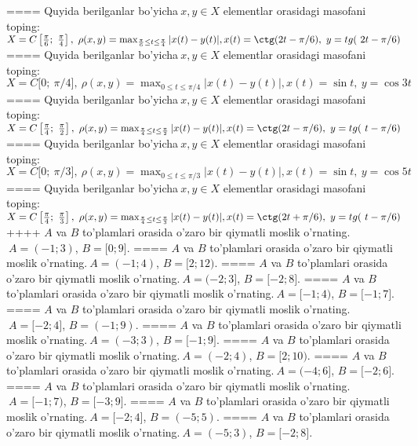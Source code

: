 ====
Quyida berilganlar bo'yicha\(\ x,y \in X\) elementlar orasidagi masofani toping: \(X = C\left\lbrack \frac{\pi}{6};\ \frac{\pi}{4} \right\rbrack,\ \rho(x,y) = \max_{\frac{\pi}{6} \leq t \leq \frac{\pi}{4}}|x(t) - y(t)|,x(t) = \ctg (2t - \pi/6),\ y = tg(\ 2t - \pi/6)\)
====
Quyida berilganlar bo'yicha\(\ x,y \in X\) elementlar orasidagi masofani toping: \(X = C\lbrack 0;\ \pi/4\rbrack,\ \rho(x,y) = \max_{0 \leq t \leq \pi/4}|x(t) - y(t)|,x(t) = \sin t,\ y = \cos3t\)
====
Quyida berilganlar bo'yicha\(\ x,y \in X\) elementlar orasidagi masofani toping: \(X = C\left\lbrack \frac{\pi}{4};\ \frac{\pi}{2} \right\rbrack,\ \rho(x,y) = \max_{\frac{\pi}{4} \leq t \leq \frac{\pi}{2}}|x(t) - y(t)|,x(t) = \ctg (2t - \pi/6),\ y = tg(\ t - \pi/6)\)
====
Quyida berilganlar bo'yicha\(\ x,y \in X\) elementlar orasidagi masofani toping: \(X = C\lbrack 0;\ \pi/3\rbrack,\ \rho(x,y) = \max_{0 \leq t \leq \pi/3}|x(t) - y(t)|,x(t) = \sin t,\ y = \cos5t\)
====
Quyida berilganlar bo'yicha\(\ x,y \in X\) elementlar orasidagi masofani toping: \(X = C\left\lbrack \frac{\pi}{4};\ \frac{\pi}{3} \right\rbrack,\ \rho(x,y) = \max_{\frac{\pi}{4} \leq t \leq \frac{\pi}{3}}|x(t) - y(t)|,x(t) = \ctg (2t + \pi/6),\ y = tg(\ t - \pi/6)\)
++++
\(A\) va \(B\) to'plamlari orasida o'zaro bir qiymatli moslik o'rnating.\(\ A = ( - 1;3)\), \(B = \lbrack 0;9\rbrack\).
====
\(A\) va \(B\) to'plamlari orasida o'zaro bir qiymatli moslik o'rnating.\(\ A = ( - 1;4)\), \(B = \lbrack 2;12)\).
====
\(A\) va \(B\) to'plamlari orasida o'zaro bir qiymatli moslik o'rnating.\(\ A = ( - 2;3\rbrack\), \(B = \lbrack - 2;8\rbrack\).
====
\(A\) va \(B\) to'plamlari orasida o'zaro bir qiymatli moslik o'rnating.\(\ A = \lbrack - 1;4)\), \(B = \lbrack - 1;7\rbrack\).
====
\(A\) va \(B\) to'plamlari orasida o'zaro bir qiymatli moslik o'rnating.\(\ A = \lbrack - 2;4\rbrack\), \(B = ( - 1;9)\).
====
\(A\) va \(B\) to'plamlari orasida o'zaro bir qiymatli moslik o'rnating.\(\ A = ( - 3;3)\), \(B = \lbrack - 1;9\rbrack\).
====
\(A\) va \(B\) to'plamlari orasida o'zaro bir qiymatli moslik o'rnating.\(\ A = ( - 2;4)\), \(B = \lbrack 2;10)\).
====
\(A\) va \(B\) to'plamlari orasida o'zaro bir qiymatli moslik o'rnating.\(\ A = ( - 4;6\rbrack\), \(B = \lbrack - 2;6\rbrack\).
====
\(A\) va \(B\) to'plamlari orasida o'zaro bir qiymatli moslik o'rnating.\(\ A = \lbrack - 1;7)\), \(B = \lbrack - 3;9\rbrack\).
====
\(A\) va \(B\) to'plamlari orasida o'zaro bir qiymatli moslik o'rnating.\(\ A = \lbrack - 2;4\rbrack\), \(B = ( - 5;5)\).
====
\(A\) va \(B\) to'plamlari orasida o'zaro bir qiymatli moslik o'rnating.\(\ A = ( - 5;3)\), \(B = \lbrack - 2;8\rbrack\).
